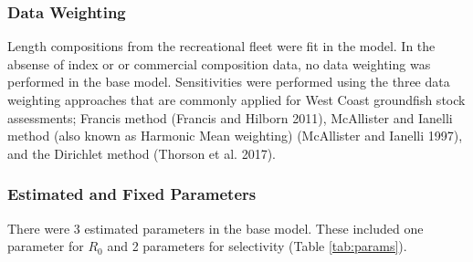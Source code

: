 \documentclass[11pt,
  english,
  a4paper,
]{article}
\begin{document}
\leavevmode\tagmcend\tagstructend\par


\hypertarget{data-weighting}{%
\subsubsection{Data Weighting}\label{data-weighting}}

\leavevmode\tagmcend\tagstructend


Length compositions from the recreational fleet were fit in the model. In the absense of index or or commercial composition data, no data weighting was performed in the base model. Sensitivities were performed using the three data weighting approaches that are commonly applied for West Coast groundfish stock assessments; Francis method {(Francis and Hilborn 2011)\leavevmode\tagmcend\tagstructend}, McAllister and Ianelli method (also known as Harmonic Mean weighting) {(McAllister and Ianelli 1997)\leavevmode\tagmcend\tagstructend}, and the Dirichlet method {(Thorson et al. 2017)\leavevmode\tagmcend\tagstructend}.

\leavevmode\tagmcend\tagstructend\par


\hypertarget{estimated-and-fixed-parameters}{%
\subsubsection{Estimated and Fixed Parameters}\label{estimated-and-fixed-parameters}}

\leavevmode\tagmcend\tagstructend


There were 3 estimated parameters in the base model. These included one parameter for {\(R_0\)\leavevmode\tagmcend\tagstructend} and 2 parameters for selectivity (Table \ref{tab:params}).

\leavevmode\tagmcend\tagstructend\par

\end{document}
